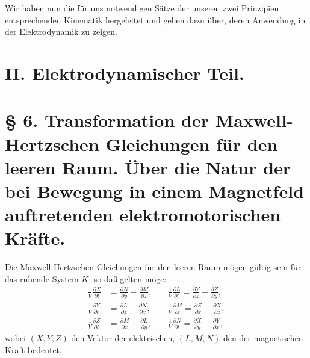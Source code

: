 \documentclass[17pt]{webarticle}       %
\begin{document}
Wir haben nun die für uns notwendigen Sätze der unseren zwei Prinzipien entsprechenden Kinematik hergeleitet und gehen dazu über, deren Anwendung in der Elektrodynamik zu zeigen.

\section*{II. Elektrodynamischer Teil.}

\section*{§ 6. Transformation der Maxwell-Hertzschen Gleichungen für den leeren Raum. Über die Natur der bei Bewegung in einem Magnetfeld auftretenden elektromotorischen Kräfte.}

Die Maxwell-Hertzschen Gleichungen für den leeren Raum mögen gültig sein für das ruhende System \( K \), so daß gelten möge:
\[
\begin{aligned} 
\frac{1}{V} \frac{\partial X}{\partial t} &= \frac{\partial N}{\partial y} - \frac{\partial M}{\partial z}, \quad 
&\frac{1}{V} \frac{\partial L}{\partial t} = \frac{\partial Y}{\partial z} - \frac{\partial Z}{\partial y},
\\
\frac{1}{V} \frac{\partial Y}{\partial t} &= \frac{\partial L}{\partial z} - \frac{\partial N}{\partial x}, \quad
&\frac{1}{V} \frac{\partial M}{\partial t} = \frac{\partial Z}{\partial x} - \frac{\partial X}{\partial z},
\\
\frac{1}{V} \frac{\partial Z}{\partial t} &= \frac{\partial M}{\partial x} - \frac{\partial L}{\partial y}, \quad
&\frac{1}{V} \frac{\partial N}{\partial t} = \frac{\partial X}{\partial y} - \frac{\partial Y}{\partial x},
\end{aligned}
\]
wobei \( (X, Y, Z) \) den Vektor der elektrischen, \( (L, M, N) \) den der magnetischen Kraft bedeutet.
\end{document}
